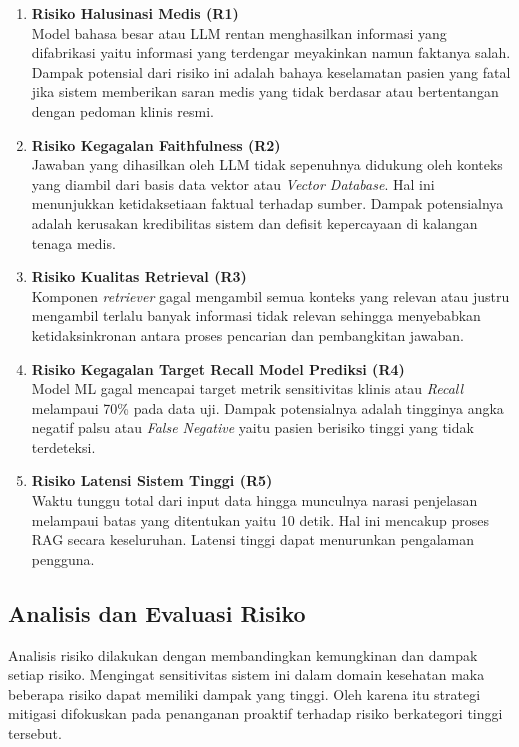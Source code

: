 \begin{enumerate}
    \item \textbf{Risiko Halusinasi Medis (R1)}\\ 
    Model bahasa besar atau LLM rentan menghasilkan informasi yang difabrikasi yaitu informasi yang terdengar meyakinkan namun faktanya salah. Dampak potensial dari risiko ini adalah bahaya keselamatan pasien yang fatal jika sistem memberikan saran medis yang tidak berdasar atau bertentangan dengan pedoman klinis resmi.
    \item \textbf{Risiko Kegagalan Faithfulness (R2)} \\ 
    Jawaban yang dihasilkan oleh LLM tidak sepenuhnya didukung oleh konteks yang diambil dari basis data vektor atau \textit{Vector Database}. Hal ini menunjukkan ketidaksetiaan faktual terhadap sumber. Dampak potensialnya adalah kerusakan kredibilitas sistem dan defisit kepercayaan di kalangan tenaga medis.
    \item \textbf{Risiko Kualitas Retrieval (R3)} \\ 
    Komponen \textit{retriever} gagal mengambil semua konteks yang relevan atau justru mengambil terlalu banyak informasi tidak relevan sehingga menyebabkan ketidaksinkronan antara proses pencarian dan pembangkitan jawaban.
    \item \textbf{Risiko Kegagalan Target Recall Model Prediksi (R4)} \\ 
    Model ML gagal mencapai target metrik sensitivitas klinis atau \textit{Recall} melampaui 70\% pada data uji. Dampak potensialnya adalah tingginya angka negatif palsu atau \textit{False Negative} yaitu pasien berisiko tinggi yang tidak terdeteksi.
    \item \textbf{Risiko Latensi Sistem Tinggi (R5)} \\ 
    Waktu tunggu total dari input data hingga munculnya narasi penjelasan melampaui batas yang ditentukan yaitu 10 detik. Hal ini mencakup proses RAG secara keseluruhan. Latensi tinggi dapat menurunkan pengalaman pengguna.
\end{enumerate}

\subsection{Analisis dan Evaluasi Risiko}
Analisis risiko dilakukan dengan membandingkan kemungkinan dan dampak setiap risiko. Mengingat sensitivitas sistem ini dalam domain kesehatan maka beberapa risiko dapat memiliki dampak yang tinggi. Oleh karena itu strategi mitigasi difokuskan pada penanganan proaktif terhadap risiko berkategori tinggi tersebut.

